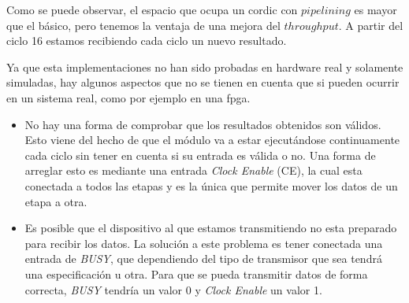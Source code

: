 Como se puede observar, el espacio que ocupa un \gls{cordic} con $pipelining$ es mayor que el básico, pero tenemos la ventaja de una mejora del $throughput$. A partir del ciclo 16 estamos recibiendo cada ciclo un nuevo resultado.

Ya que esta implementaciones no han sido probadas en hardware real y solamente simuladas, hay algunos aspectos que no se tienen en cuenta que si pueden ocurrir en un sistema real, como por ejemplo en una \gls{fpga}.

\begin{itemize}
	\item No hay una forma de comprobar que los resultados obtenidos son válidos. Esto viene del hecho de que el módulo va a estar ejecutándose continuamente cada ciclo sin tener en cuenta si su entrada es válida o no. Una forma de arreglar esto es mediante una entrada \textit{Clock Enable} (CE), la cual esta conectada a todos las etapas y es la única que permite mover los datos de un etapa a otra.
	
	\item Es posible que el dispositivo al que estamos transmitiendo no esta preparado para recibir los datos. La solución a este problema es tener conectada una entrada de \textit{BUSY}, que dependiendo del tipo de transmisor que sea tendrá una especificación u otra. Para que se pueda transmitir datos de forma correcta, \textit{BUSY} tendría un valor 0 y \textit{Clock Enable} un valor 1.
\end{itemize}

